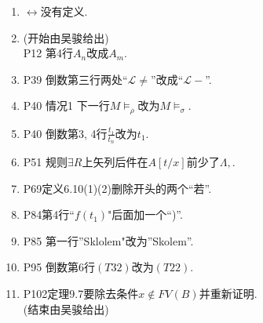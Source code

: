 \documentclass{article}
\begin{document}
\begin{enumerate}
\item $\leftrightarrow$没有定义. 
\item (开始由吴骏给出)\\P12 第4行$A_n$改成$A_m$. 
\item P39 倒数第三行两处``$\mathscr{L}\ne$''改成``$\mathscr{L}-$''. 
\item P40 情况1 下一行$M\models_\rho$改为$M\models_\sigma$. 
\item P40 倒数第3, 4行$\frac{t_1}{t_n}$改为$t_1$. 
\item P51 规则$\exists R$上矢列后件在$A[t/x]$前少了$\Lambda, $. 
\item P69定义6.10(1)(2)删除开头的两个``若''. 
\item P84第4行``$f(t_1)$"后面加一个``)''. 
\item P85 第一行''Sklolem"改为''Skolem''. 
\item P95 倒数第6行$(T32)$改为$(T22)$. 
\item P102定理9.7要除去条件$x\notin FV(B)$并重新证明. \\(结束由吴骏给出)






\end{enumerate}
\end{document}
